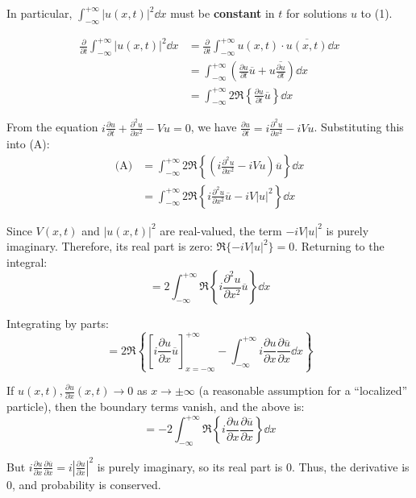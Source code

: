 In particular, $\int_{-\infty}^{+\infty} |u(x,t)|^2 \dd x$ must be \textbf{constant} in $t$ for solutions $u$ to (1). 

\begin{proofbox}

\begin{align*}
    \frac{\partial}{\partial t} \int_{-\infty}^{+\infty} |u(x,t)|^2 \dd x &= \frac{\partial}{\partial t} \int_{-\infty}^{+\infty} u(x,t) \cdot \overline{u(x,t)} \dd x \\
    &= \int_{-\infty}^{+\infty} \left( \frac{\partial u}{\partial t} \overline{u} + u \overline{\frac{\partial u}{\partial t}} \right) \dd x \\
    &= \int_{-\infty}^{+\infty} 2 \Re \left\{ \frac{\partial u}{\partial t} \overline{u} \right\} \dd x \tag{A}
\end{align*}

From the equation $i \frac{\partial u}{\partial t} + \frac{\partial^2 u}{\partial x^2} - Vu = 0$, we have $\frac{\partial u}{\partial t} = i\frac{\partial^2 u}{\partial x^2} - iVu$. Substituting this into (A):
\begin{align*}
    \text{(A)} &= \int_{-\infty}^{+\infty} 2 \Re \left\{ \left( i\frac{\partial^2 u}{\partial x^2} - iVu \right) \overline{u} \right\} \dd x \\
    &= \int_{-\infty}^{+\infty} 2 \Re \left\{ i \frac{\partial^2 u}{\partial x^2} \overline{u} - i V |u|^2 \right\} \dd x
\end{align*}

Since $V(x,t)$ and $|u(x,t)|^2$ are real-valued, the term $-iV|u|^2$ is purely imaginary. Therefore, its real part is zero: $\Re \{ -iV|u|^2 \} = 0$.
Returning to the integral:
$$ = 2 \int_{-\infty}^{+\infty} \Re \left\{ i \frac{\partial^2 u}{\partial x^2} \overline{u} \right\} \dd x $$

Integrating by parts:
$$ = 2 \Re \left\{ \left[ i \frac{\partial u}{\partial x} \overline{u} \right]_{x=-\infty}^{+\infty} - \int_{-\infty}^{+\infty} i \frac{\partial u}{\partial x} \frac{\partial \overline{u}}{\partial x} \dd x \right\} $$

If $u(x,t), \frac{\partial u}{\partial x}(x,t) \rightarrow 0$ as $x \rightarrow \pm\infty$ (a reasonable assumption for a ``localized'' particle), then the boundary terms vanish, and the above is:
$$ = -2 \int_{-\infty}^{+\infty} \Re \left\{ i \frac{\partial u}{\partial x} \frac{\partial \overline{u}}{\partial x} \right\} \dd x $$

But $i \frac{\partial u}{\partial x} \frac{\partial \overline{u}}{\partial x} = i \left| \frac{\partial u}{\partial x} \right|^2$ is purely imaginary, so its real part is $0$. 
Thus, the derivative is $0$, and probability is conserved.
\end{proofbox}

